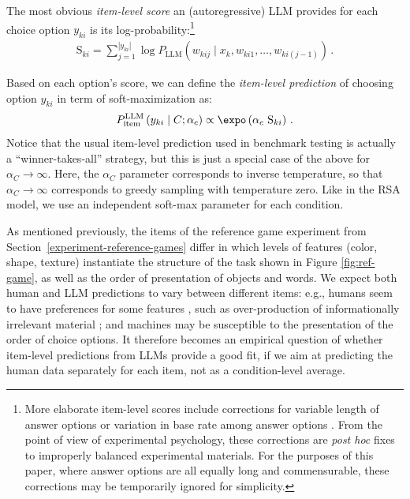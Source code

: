 \documentclass[fleqn]{article}
\begin{document}
The most obvious \emph{item-level score} an (autoregressive) LLM provides for each choice option $y_{ki}$ is its log-probability:\footnote{
  More elaborate item-level scores include corrections for variable length of answer options \citep[e.g.,][]{BrownMann2020:Language-Models} or variation in base rate among answer options \citep[e.g.,][]{HoltzmanWest2021:Surface-Form-Co}.
  From the point of view of experimental psychology, these corrections are \emph{post hoc} fixes to improperly balanced experimental materials.
  For the purposes of this paper, where answer options are all equally long and commensurable, these corrections may be temporarily ignored for simplicity.
}
%
\begin{align*}
  \text{S}_{ki}
  =  \sum_{j=1}^{|y_{ki}|} \log P_{\text{LLM}} \left(w_{kij} \mid x_{k}, w_{ki1}, \dots, w_{ki(j-1)} \right)  \,.
\end{align*}
%

Based on each option's score, we can define the \emph{item-level prediction} of choosing option $y_{ki}$ in term of soft-maximization as:
%
\begin{align*}
P_{\text{item}}^{\text{LLM}}\left ( y_{ki} \mid C; \alpha_{c} \right ) \propto \expo \left (\alpha_{c} \ \text{S}_{ki} \right)\,.
\end{align*}
%
Notice that the usual item-level prediction used in benchmark testing is actually a ``winner-takes-all'' strategy, but this is just a special case of the above for $\alpha_{C} \rightarrow \infty$.
Here, the $\alpha_{C}$ parameter corresponds to inverse temperature, so that $\alpha_{C} \rightarrow \infty$ corresponds to greedy sampling with temperature zero.
Like in the RSA model, we use an independent soft-max parameter for each condition.

As mentioned previously, the items of the reference game experiment from Section~\ref{experiment-reference-games} differ in which levels of features (color, shape, texture) instantiate the structure of the task shown in Figure \ref{fig:ref-game}, as well as the order of presentation of objects and words.
We expect both human and LLM predictions to vary between different items: e.g., humans seem to have preferences for some features \citep[e.g.,][]{QingFranke2013:Variations-on-a}, such as over-production of informationally irrelevant material \citep[e.g.,][]{DaviesKatsos2010:Over-informativ,Rubio-Fernandez2019:Overinformative,DegenHawkins2020:When-redundancy}; and machines may be susceptible to the presentation of the order of choice options. 
It therefore becomes an empirical question of whether item-level predictions from LLMs provide a good fit, if we aim at predicting the human data separately for each item, not as a condition-level average.
\end{document}
